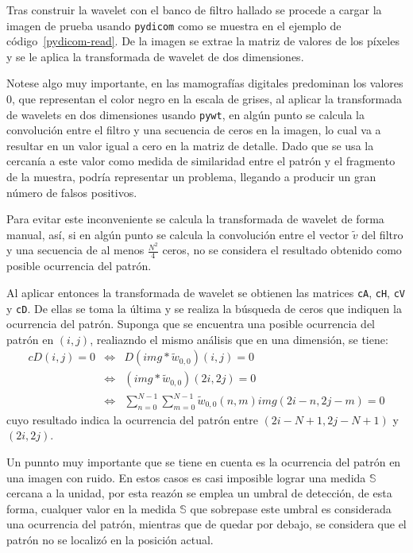 \par Tras construir la wavelet con el banco de filtro hallado se procede a cargar la imagen de prueba usando \texttt{pydicom} como se muestra en el ejemplo de c\'odigo~\ref{pydicom-read}. De la imagen se extrae la matriz de valores de los p\'ixeles y se le aplica la transformada de wavelet de dos dimensiones.
\par Notese algo muy importante, en las mamograf\'ias digitales predominan los valores 0, que representan el color negro en la escala de grises, al aplicar la transformada de wavelets en dos dimensiones usando \texttt{pywt}, en alg\'un punto se calcula la convoluci\'on entre el filtro y una secuencia de ceros en la imagen, lo cual va a resultar en un valor igual a cero en la matriz de detalle. Dado que se usa la cercan\'ia a este valor como medida de similaridad entre el patr\'on y el fragmento de la muestra, podr\'ia representar un problema, llegando a producir un gran n\'umero de falsos positivos.
\par Para evitar este inconveniente se calcula la transformada de wavelet de forma manual, as\'i, si en alg\'un punto se calcula la convoluci\'on entre el vector $\tilde{v}$ del filtro y una secuencia de al menos $\frac{N^2}{4}$ ceros, no se considera el resultado obtenido como posible ocurrencia del patr\'on.\\

\par Al aplicar entonces la transformada de wavelet se obtienen las matrices \texttt{cA}, \texttt{cH}, \texttt{cV} y \texttt{cD}. De ellas se toma la \'ultima y se realiza la b\'usqueda de ceros que indiquen la ocurrencia del patr\'on. Suponga que se encuentra una posible ocurrencia del patr\'on en $(i,j)$, realiazndo el mismo an\'alisis que en una dimensi\'on, se tiene:
\begin{eqnarray}
cD(i,j)=0&\Leftrightarrow&D(img\ast\tilde{w}_{0,0})(i,j)=0\nonumber\\
&\Leftrightarrow&(img\ast\tilde{w}_{0,0})(2i,2j)=0\nonumber\\
&\Leftrightarrow&\sum_{n=0}^{N-1}\sum_{m=0}^{N-1}\tilde{w}_{0,0}(n,m)img(2i-n,2j-m)=0\nonumber
\end{eqnarray}
cuyo resultado indica la ocurrencia del patr\'on entre $(2i-N+1,2j-N+1)$ y $(2i,2j)$.

\par Un punnto muy importante que se tiene en cuenta es la ocurrencia del patr\'on en una imagen con ruido. En estos casos es casi imposible lograr una medida $\mathbb{S}$ cercana a la unidad, por esta reaz\'on se emplea un umbral de detecci\'on, de esta forma, cualquer valor en la medida $\mathbb{S}$ que sobrepase este umbral es considerada una ocurrencia del patr\'on, mientras que de quedar por debajo, se considera que el patr\'on no se localiz\'o en la posici\'on actual.\\

